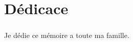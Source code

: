 \chapter{Dédicace}
\paragraph{}
\paragraph{}
\paragraph{}
\begin{flushright}
 Je dédie ce mémoire a toute ma famille.
\end{flushright}
 



